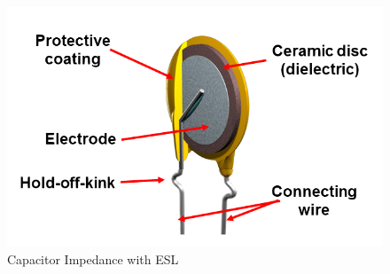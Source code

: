 \begin{figure}
\includegraphics[keepaspectratio=true,scale=.5]{./figures/parameters/eslPlot.png}
\centering
\caption{Capacitor Impedance with ESL}
\label{eslPlot}
\end{figure}
